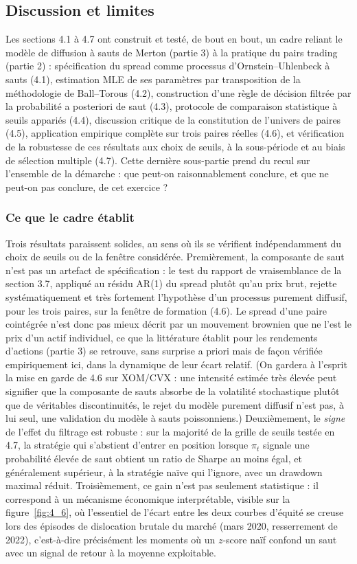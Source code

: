 \documentclass{article}
\begin{document}
\subsection{Discussion et limites}
Les sections 4.1 à 4.7 ont construit et testé, de bout en bout, un cadre reliant le modèle de diffusion à sauts de Merton (partie 3) à la pratique du pairs trading (partie 2) : spécification du spread comme processus d'Ornstein--Uhlenbeck à sauts (4.1), estimation MLE de ses paramètres par transposition de la méthodologie de Ball--Torous (4.2), construction d'une règle de décision filtrée par la probabilité a posteriori de saut (4.3), protocole de comparaison statistique à seuils appariés (4.4), discussion critique de la constitution de l'univers de paires (4.5), application empirique complète sur trois paires réelles (4.6), et vérification de la robustesse de ces résultats aux choix de seuils, à la sous-période et au biais de sélection multiple (4.7). Cette dernière sous-partie prend du recul sur l'ensemble de la démarche : que peut-on raisonnablement conclure, et que ne peut-on pas conclure, de cet exercice ?
\subsubsection*{Ce que le cadre établit}
Trois résultats paraissent solides, au sens où ils se vérifient indépendamment du choix de seuils ou de la fenêtre considérée. Premièrement, la composante de saut n'est pas un artefact de spécification : le test du rapport de vraisemblance de la section 3.7, appliqué au résidu AR(1) du spread plutôt qu'au prix brut, rejette systématiquement et très fortement l'hypothèse d'un processus purement diffusif, pour les trois paires, sur la fenêtre de formation (4.6). Le spread d'une paire cointégrée n'est donc pas mieux décrit par un mouvement brownien que ne l'est le prix d'un actif individuel, ce que la littérature établit pour les rendements d'actions (partie 3) se retrouve, sans surprise a priori mais de façon vérifiée empiriquement ici, dans la dynamique de leur écart relatif. (On gardera à l'esprit la mise en garde de 4.6 sur XOM/CVX : une intensité estimée très élevée peut signifier que la composante de sauts absorbe de la volatilité stochastique plutôt que de véritables discontinuités, le rejet du modèle purement diffusif n'est pas, à lui seul, une validation du modèle à sauts poissonniens.) Deuxièmement, le \emph{signe} de l'effet du filtrage est robuste : sur la majorité de la grille de seuils testée en 4.7, la stratégie qui s'abstient d'entrer en position lorsque $\pi_t$ signale une probabilité élevée de saut obtient un ratio de Sharpe au moins égal, et généralement supérieur, à la stratégie naïve qui l'ignore, avec un drawdown maximal réduit. Troisièmement, ce gain n'est pas seulement statistique : il correspond à un mécanisme économique interprétable, visible sur la figure~\ref{fig:4_6}, où l'essentiel de l'écart entre les deux courbes d'équité se creuse lors des épisodes de dislocation brutale du marché (mars 2020, resserrement de 2022), c'est-à-dire précisément les moments où un $z$-score naïf confond un saut avec un signal de retour à la moyenne exploitable.
\end{document}
